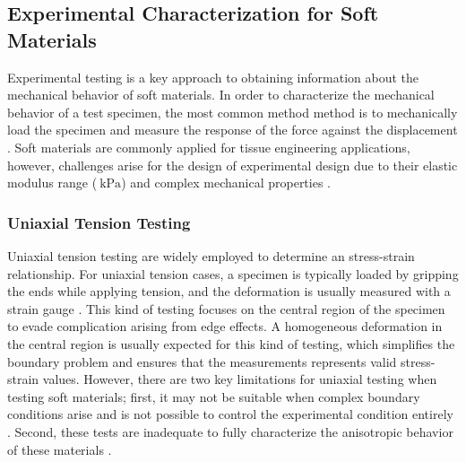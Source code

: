 \subsection{Experimental Characterization for Soft Materials}
\label{subsection:experimentalcharacterization}
Experimental testing is a key approach to obtaining information about the mechanical behavior of soft materials.
In order to characterize the mechanical behavior of a test specimen, the most common method
method is to mechanically load the specimen and measure the response of the force against 
the displacement \cite{Bergström2015}. Soft materials are commonly applied 
for tissue engineering applications, however, challenges arise for the 
design of experimental design due to their elastic modulus range ($\SI{}{\kilo \pascal}$) and complex
mechanical properties \cite{Liu2009}.\\



\subsubsection*{Uniaxial Tension Testing}

Uniaxial tension testing are widely employed to determine an stress-strain relationship.
For uniaxial tension cases, a specimen is typically loaded by gripping the ends while applying 
tension, and the deformation is usually measured with a strain gauge \cite{Bergström2015}.
This kind of testing focuses on the central region of the specimen to evade complication arising from 
edge effects. A homogeneous deformation in the central region is usually expected for this kind of testing, 
which simplifies the boundary problem and ensures that the measurements represents valid stress-strain values.
However, there are two key limitations for uniaxial testing when testing soft materials; first, 
it may not be suitable when complex boundary conditions arise and is not possible to control the 
experimental condition entirely \cite{Seshaiyer2003}. Second, these tests are inadequate to 
fully characterize the anisotropic behavior of these materials \cite{Cox2006}.\\


